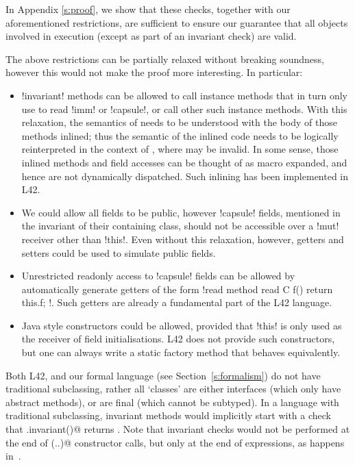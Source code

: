 \noindent In Appendix \ref{s:proof}, we show that these checks, together with our aforementioned restrictions, are sufficient to ensure our guarantee that all objects involved in execution (except as part of an invariant check) are valid.

The above restrictions can be partially relaxed without breaking soundness, however this would not make the proof more interesting. In particular:
\begin{itemize}
	\item \Q!invariant! methods can be allowed to call instance methods that in turn only use \Q@this@ to read \Q!imm! or \Q!capsule!, or call other such instance methods. With this relaxation, the semantics of \Q@invariant@ needs to be understood with the body of those methods inlined; thus the semantic of the inlined code needs to be logically reinterpreted in the context of \Q@invariant@, where \Q@this@ may be invalid. In some sense, those inlined methods and field accesses can be thought of as macro expanded, and hence are not dynamically dispatched. Such inlining has been implemented in L42.
	\item We could allow all fields to be public, however \Q!capsule! fields, mentioned in the invariant of their containing class, should not be accessible over a \Q!mut! receiver other than \Q!this!. Even without this relaxation, however, getters and setters could be used to simulate public fields.
	\item Unrestricted readonly access to \Q!capsule! fields can be allowed by automatically generate getters of the form \Q!read method read C f() { return this.f; }!. Such getters are already a fundamental part of the L42 language.
	
	\item Java style constructors could be allowed, provided that \Q!this! is only used as the receiver of field initialisations. L42 does not provide such constructors, but one can always write a static factory method that behaves equivalently.
\end{itemize}
Both L42, and our formal language (see Section~\ref{s:formalism}) do not have traditional subclassing, rather all `classes' are either interfaces (which only have abstract methods), or are final (which cannot be subtyped). In a language with traditional subclassing, invariant methods would implicitly start with a check that \Q@super.invariant()@ returns \Q@true@. Note that invariant checks would not be performed at the end of \Q@super(..)@ constructor calls, but only at the end of \Q@new@ expressions, as happens in~\cite{feldman2006jose}.

